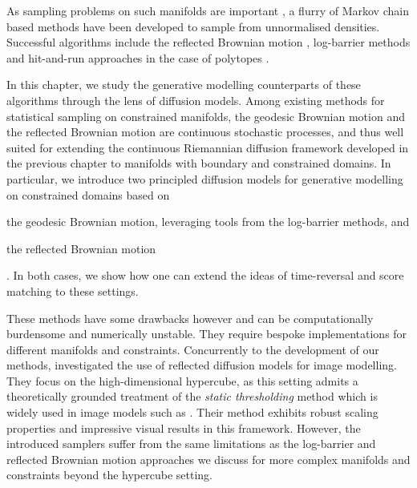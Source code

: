 As sampling problems on such manifolds are important \parencite{kook2022sampling,heirendt2019creation}, a flurry of Markov chain based methods have been developed to sample from unnormalised densities.
Successful algorithms include the reflected Brownian motion \parencite{williams1987Reflected,petit1997Time,shkolnikov2013Timereversal}, log-barrier methods \parencite{Kannan2009,lee2017Geodesic,noble2022Barrier,kook2022sampling,gatmiry2022convergence,lee2018convergence} and hit-and-run approaches in the case of polytopes \parencite{Smith1984,Lovasz2006}.

In this chapter, we study the generative modelling counterparts of these algorithms through the lens of diffusion models.
Among existing methods for statistical sampling on constrained manifolds, the geodesic Brownian motion \parencite{lee2017Geodesic} and the reflected Brownian motion \parencite{williams1987Reflected} are continuous stochastic processes, and thus well suited for extending the continuous Riemannian diffusion framework developed in the previous chapter to manifolds with boundary and constrained domains.
In particular, we introduce two principled diffusion models for generative modelling on constrained domains based on \begin{enumerate*}[label=(\roman*)] \item the geodesic Brownian motion, leveraging tools from the log-barrier methods, and \item the reflected Brownian motion \end{enumerate*}.
In both cases, we show how one can extend the ideas of time-reversal and score matching to these settings.

These methods have some drawbacks however and can be computationally burdensome and numerically unstable.
They require bespoke implementations for different manifolds and constraints.
Concurrently to the development of our methods, \textcite{lou2023reflected} investigated the use of reflected diffusion models for image modelling.
They focus on the high-dimensional hypercube, as this setting admits a theoretically grounded treatment of the \emph{static thresholding} method which is widely used in image models such as \textcite{saharia2022photorealistic}.
Their method exhibits robust scaling properties and impressive visual results in this framework.
However, the introduced samplers suffer from the same limitations as the log-barrier and reflected Brownian motion approaches we discuss for more complex manifolds and constraints beyond the hypercube setting.

